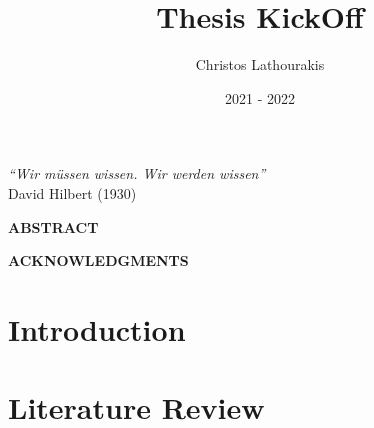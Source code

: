 \documentclass[11pt]{article}
\title{Thesis KickOff}
\author{Christos Lathourakis}
\date{2021 - 2022}
\begin{document}


\newpage




\vspace*{5cm}

\begin{flushright}
	\textit{``{\lat Wir m\"ussen wissen. Wir werden wissen}''} \\
	{\lat David Hilbert} (1930)
\end{flushright}

\vspace*{\fill}

\newpage 

{\Large \textbf{ABSTRACT}}
\newline
\vspace{0.5cm}



\newpage

{\Large \textbf{ACKNOWLEDGMENTS}}
\newline
\vspace{0.5cm}



\newpage


\tableofcontents

\newpage

\listoffigures

\listoftables

\listofalgorithms

\newpage
\thispagestyle{plain}
\printglossary[type=\acronymtype]


\newpage


\section{Introduction}


\newpage
\section{Literature Review} \label{LitReview}

\end{document}
